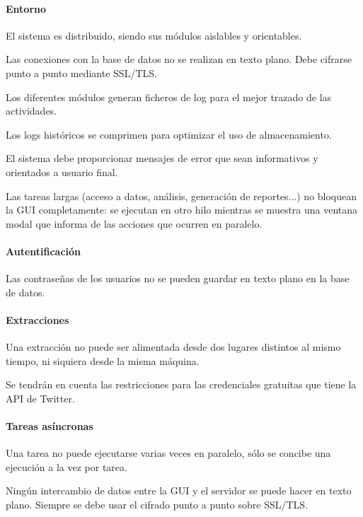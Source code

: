 \begin{nonfunctional}
\paragraph{Entorno}
\item El sistema es distribuido, siendo sus módulos aislables y orientables.
\item Las conexiones con la base de datos no se realizan en texto plano. Debe cifrarse punto a punto mediante SSL/TLS.
\item Los diferentes módulos generan ficheros de log para el mejor trazado de las actividades.
\item Los logs históricos se comprimen para optimizar el uso de almacenamiento. 
\item El sistema debe proporcionar mensajes de error que sean informativos y orientados a usuario final.
\item Las tareas largas (acceso a datos, análisis, generación de reportes...) no bloquean la GUI completamente: se ejecutan en otro hilo mientras se muestra una ventana modal que informa de las acciones que ocurren en paralelo.
\paragraph{Autentificación}
 \item Las contraseñas de los usuarios no se pueden guardar en texto plano en la base de datos.
 \paragraph{Extracciones}
 \item Una extracción no puede ser alimentada desde dos lugares distintos al mismo tiempo, ni siquiera desde la misma máquina.
 \item Se tendrán en cuenta las restricciones para las credenciales gratuitas que tiene la API de Twitter. 
 \paragraph{Tareas asíncronas}
 \item Una tarea no puede ejecutarse varias veces en paralelo, sólo se concibe una ejecución a la vez por tarea.
 \item Ningún intercambio de datos entre la GUI y el servidor se puede hacer en texto plano. Siempre se debe usar el cifrado punto a punto sobre SSL/TLS.
\end{nonfunctional}
